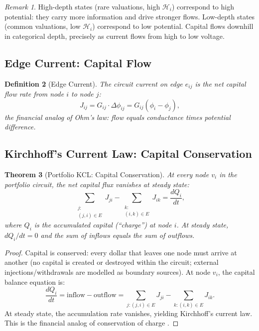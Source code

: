 \documentclass[twocolumn,10pt]{article}
\newtheorem{theorem}{Theorem}[section]
\newtheorem{definition}[theorem]{Definition}
\theoremstyle{remark}
\newtheorem{remark}[theorem]{Remark}
\begin{document}
\begin{remark}
High-depth states (rare valuations, high $\mathcal{H}_i$) correspond to high potential: they carry more information and drive stronger flows.  Low-depth states (common valuations, low $\mathcal{H}_i$) correspond to low potential.  Capital flows downhill in categorical depth, precisely as current flows from high to low voltage.
\end{remark}

\subsection{Edge Current: Capital Flow}

\begin{definition}[Edge Current]
\label{def:edge_current}
The \emph{circuit current} on edge $e_{ij}$ is the net capital flow rate from node $i$ to node $j$:
\begin{equation}
    J_{ij} = G_{ij} \cdot \Delta\phi_{ij} = G_{ij}(\phi_i - \phi_j),
    \label{eq:edge_current}
\end{equation}
the financial analog of Ohm's law: flow equals conductance times potential difference.
\end{definition}

\subsection{Kirchhoff's Current Law: Capital Conservation}

\begin{theorem}[Portfolio KCL: Capital Conservation]
\label{thm:portfolio_kcl}
At every node $v_i$ in the portfolio circuit, the net capital flux vanishes at steady state:
\begin{equation}
    \sum_{\substack{j:\\(j,i) \in E}} J_{ji} - \sum_{\substack{k:\\(i,k) \in E}} J_{ik} = \frac{dQ_i}{dt},
    \label{eq:portfolio_kcl}
\end{equation}
where $Q_i$ is the accumulated capital (``charge'') at node $i$.  At steady state, $dQ_i/dt = 0$ and the sum of inflows equals the sum of outflows.
\end{theorem}

\begin{proof}
Capital is conserved: every dollar that leaves one node must arrive at another (no capital is created or destroyed within the circuit; external injections/withdrawals are modelled as boundary sources).  At node $v_i$, the capital balance equation is:
\begin{equation}
    \frac{dQ_i}{dt} = \text{inflow} - \text{outflow} = \sum_{j:(j,i) \in E} J_{ji} - \sum_{k:(i,k) \in E} J_{ik}.
\end{equation}
At steady state, the accumulation rate vanishes, yielding Kirchhoff's current law.  This is the financial analog of conservation of charge \cite{kirchhoff1845}.
\end{proof}
\end{document}
